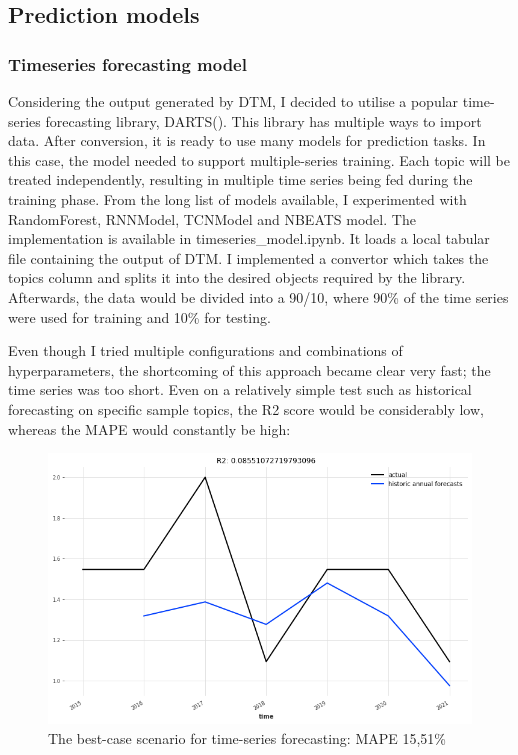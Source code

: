\documentclass[12pt,MSc,a4paper,oneside]{muthesis}
\begin{document}
\subsection{Prediction models}
\subsubsection{Timeseries forecasting model}

Considering the output generated by DTM, I decided to utilise a popular time-series forecasting library, DARTS(\cite{herzen2021darts}). This library has multiple ways to import data. After conversion, it is ready to use many models for prediction tasks. In this case, the model needed to support multiple-series training. Each topic will be treated independently, resulting in multiple time series being fed during the training phase. From the long list of models available, I experimented with RandomForest, RNNModel, TCNModel and NBEATS model.
The implementation is available in timeseries\_model.ipynb. It loads a local tabular file containing the output of DTM. I implemented a convertor which takes the topics column and splits it into the desired objects required by the library. Afterwards, the data would be divided into a 90/10, where 90\% of the time series were used for training and 10\% for testing.
 
Even though I tried multiple configurations and combinations of hyperparameters, the shortcoming of this approach became clear very fast; the time series was too short. Even on a relatively simple test such as historical forecasting on specific sample topics, the R2 score would be considerably low, whereas the MAPE would constantly be high:

\begin{figure}[h]
    \centering
    \includegraphics[scale=0.3]{timeseries_forecasting_best_case_scenario.png}
    \caption{The best-case scenario for time-series forecasting: MAPE 15,51\%}
\end{figure}
\end{document}
